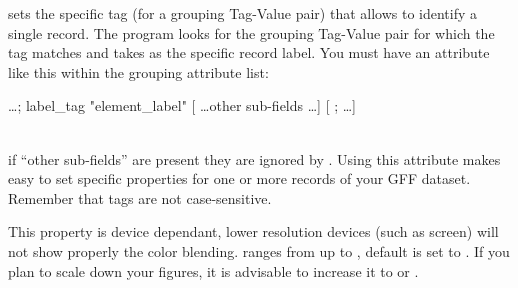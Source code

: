 %
   {  sets the specific tag (for a grouping Tag-Value pair) that allows to identify a single record. The program looks for the grouping Tag-Value pair for which the tag matches  and takes  as the specific record label. You must have an attribute like this within the grouping attribute list: \\[0.75ex] 
 \centerline{ \ldots ; label\_tag "element\_label" [ \ldots other sub-fields \ldots ] [ ; \ldots ] }\\[0.75ex] 
 if ``other sub-fields'' are present they are ignored by \prog. Using this attribute makes easy to set specific properties for one or more records of your GFF dataset. Remember that tags are not case-sensitive. }
%
   { {\tbdef} }
%
   { {\tbdef} }
%
   { {\tbdef} }
%
   { {\tbdef} }
%
   { {\tbdef} }
%
   { {\tbdef} }
%
   { {\tbdef} }
%
   { {\tbdef} }
%
   { {\tbdef} }
%
   { This property is device dependant, lower resolution devices (such as screen) will not show properly the color blending. }
%
   {  ranges from  up to , default is set to . If you plan to scale down your figures, it is advisable to increase it to  or . }
%
   { {\tbdef} }
%
   { {\tbdef} }
%
